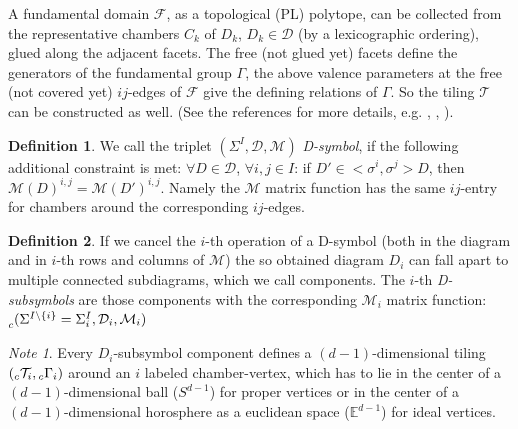 \documentclass[12pt,a4paper]{article}
\numberwithin{equation}{section}
\newcommand{\leftsub}[2]{{\vphantom{#2}}_{#1}{#2}}
\theoremstyle{plain}%
\theoremstyle{definition}
\newtheorem{defn}{Definition}[section]
\theoremstyle{remark}
\newtheorem*{note}{Note}
\begin{document}
A fundamental domain $\mathcal{F}$, as a topological (PL) polytope, can be collected
from the representative chambers $C_k$ of $D_k$, $D_k\in\mathcal{D}$ (by a
lexicographic ordering), glued along the adjacent facets. The free (not glued
yet) facets define the generators of the fundamental group $\Gamma$, the above
valence parameters at the free (not covered yet) $ij$-edges of $\mathcal{F}$
give the defining relations of $\Gamma$. So the tiling $\mathcal{T}$ can be
constructed as well. (See the references for more details,
e.g. \cite{DHM93}, \cite{M96}, \cite{M11}).

\begin{defn}
  We call the triplet $(\Sigma^I,\mathcal{D},\mathcal{M})$ {\em D-symbol}, if the
  following additional constraint is met:
  $\forall D\in \mathcal{D}$, $\forall i,j\in I$: if $D' \in
  <\sigma^i,\sigma^j>D$, then $\mathcal{M}(D)^{i,j}=\mathcal{M}(D')^{i,j}$.
  Namely the $\mathcal{M}$ matrix function has the same $ij$-entry for chambers around the
  corresponding $ij$-edges.
\end{defn}


\begin{defn}
  If we cancel the $i$-th operation of a D-symbol (both in the diagram and in
  $i$-th rows and columns of $\mathcal{M}$) the so obtained diagram $D_i$ can fall apart to multiple
  connected subdiagrams, which we call components. The $i$-th {\em D-subsymbols} are
  those components with the corresponding $\mathcal{M}_i$ matrix function:
  $\leftsub{c}{(\Sigma^{I\setminus\{i\}}=\Sigma^I_i,\mathcal{D}_i,\mathcal{M}_i)}$
\end{defn}

\begin{note}
  Every $D_i$-subsymbol component defines a $(d-1)$-dimensional tiling
  $(\leftsub{c}{\mathcal{T}}_i,\leftsub{c}{\Gamma}_i)$ around an $i$ labeled chamber-vertex, which has to lie
  in the center of a $(d-1)$-dimensional ball ($S^{d-1}$) for proper vertices or
  in the center of a $(d-1)$-dimensional horosphere as a
  euclidean space ($\mathbb{E}^{d-1}$) for ideal vertices.
\end{note}
\end{document}
